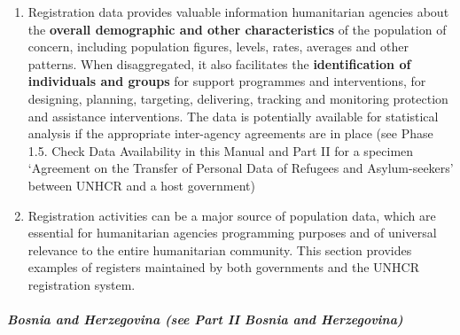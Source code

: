 \documentclass[
]{article}
\begin{document}
\begin{enumerate}
\def\labelenumi{\arabic{enumi}.}
\setcounter{enumi}{172}
\item
  Registration data provides valuable information humanitarian
  agencies about the \textbf{overall demographic and other characteristics}
  of the population of concern, including population figures, levels,
  rates, averages and other patterns. When disaggregated, it also
  facilitates the \textbf{identification of individuals and groups} for
  support programmes and interventions, for designing, planning,
  targeting, delivering, tracking and monitoring protection and
  assistance interventions. The data is potentially available for
  statistical analysis if the appropriate inter-agency agreements are
  in place (see Phase 1.5. Check Data Availability in this Manual and
  Part II for a specimen `Agreement on the Transfer of Personal Data
  of Refugees and Asylum-seekers' between UNHCR and a host government)
\item
  Registration activities can be a major source of population data,
  which are essential for humanitarian agencies programming purposes
  and of universal relevance to the entire humanitarian community.
  This section provides examples of registers maintained by both
  governments and the UNHCR registration system.
\end{enumerate}

\hypertarget{bosnia-and-herzegovina-see-part-ii-bosnia-and-herzegovina}{%
\subparagraph{Bosnia and Herzegovina (see Part II Bosnia and Herzegovina)}\label{bosnia-and-herzegovina-see-part-ii-bosnia-and-herzegovina}}
\end{document}
